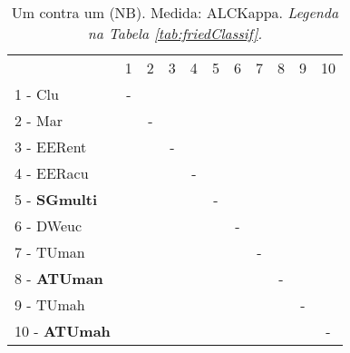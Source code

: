 \begin{table}[h]
\caption{Um contra um (NB). Medida: ALCKappa. \textit{Legenda na Tabela \ref{tab:friedClassif}.}}
\begin{center}\begin{tabular}{lcc|cc|cc|cc|cc}
 			& 1 & 2 & 3 & 4 & 5 & 6 & 7 & 8 & 9 & 10\\
1 - Clu  	& - &   &   &   &   &   &   &   &   &   \\
2 - Mar  	&   & - &   &   &   &   &   &   &   &   \\ \hline
3 - EERent	&   &   & - &   &   &   &   &   &   &   \\
4 - EERacu	&   &   &   & - &   &   &   &   &   &   \\ \hline
5 - \textbf{SGmulti}	&   &   &   &   & - &   &   &   &   &   \\
6 - DWeuc	&   &   &   &   &   & - &   &   &   &   \\ \hline
7 - TUman	&   &   &   &   &   &   & - &   &   &   \\
8 - \textbf{ATUman}	&   &   &   &   &   &   &   & - &   &   \\ \hline
9 - TUmah	&   &   &   &   &   &   &   &   & - &   \\
10 - \textbf{ATUmah}	&   &   &   &   &   &   &   &   &   & - \\ \hline\end{tabular}
\label{stratsALCKappaFriedNBRiscoRedux}
\end{center}
\end{table}